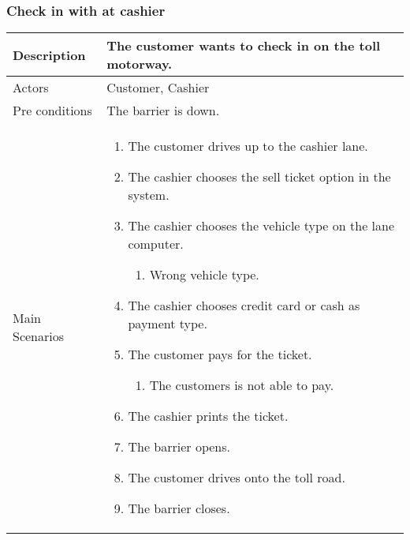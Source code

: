 \subsubsection*{Check in with at cashier}

\begin{table}[H]
    \begin{tabular}{| p{3cm}| p{11.5cm}|}
        \hline
        
        Description             & The customer wants to check in on the toll motorway. \\\hline
        Actors                  & Customer, Cashier \\\hline
        Pre conditions          & The barrier is down. \\\hline
        
        Main Scenarios	        &
         
        \renewcommand{\labelenumi}{\arabic{enumi}.}
        \renewcommand{\labelenumii}{\Roman{enumii}:}
        
        \begin{enumerate}[topsep=0.0cm, leftmargin=0.5cm]
            \item The customer drives up to the cashier lane.
            \item The cashier chooses the sell ticket option in the system.
            \item The cashier chooses the vehicle type on the lane computer.
            \begin{enumerate}[partopsep=4cm, topsep=0cm, leftmargin=1cm]
                \item Wrong vehicle type.
        	\end{enumerate}
            \item The cashier chooses credit card or cash as payment type.
            \item The customer pays for the ticket.
            \begin{enumerate}[partopsep=4cm, topsep=0cm, leftmargin=1cm]
                \item The customers is not able to pay.
        	\end{enumerate}
        	\item The cashier prints the ticket.
        	\item The barrier opens.
        	\item The customer drives onto the toll road.
        	\item The barrier closes.
        \end{enumerate} \\\hline	
        

\end{tabular}
\end{table}
